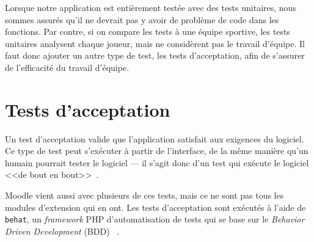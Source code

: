 Lorsque notre application est enti\`erement test\'ee avec des tests unitaires, nous sommes assur\'es qu'il ne devrait pas y avoir de probl\`eme de code dans les fonctions.
Par contre, si on compare les tests \`a une \'equipe sportive, les tests unitaires analysent chaque joueur, mais ne consid\`erent pas le travail d'\'equipe.
Il faut donc ajouter un autre type de test, les tests d'acceptation, afin de s'assurer de l'efficacit\'e du travail d'\'equipe.

\section{Tests d'acceptation}
\label{test_acceptation}
Un test d'acceptation valide que l'application satisfait aux exigences du logiciel.
Ce type de test peut s'ex\'ecuter \`a partir de l'interface, de la m\^eme mani\`ere qu'un humain pourrait tester le logiciel --- il s'agit donc d'un test qui ex\'ecute le logiciel <<de bout en bout>>~\cite{tremblay16}.

Moodle vient aussi avec plusieurs de ces tests, mais ce ne sont pas tous les modules d'extension qui en ont.
%
Les tests d'acceptation sont ex\'ecut\'es \`a l'aide de \texttt{behat}, un \textit{framework} PHP d'automatisation de tests qui se base sur le \og \textit{Behavior Driven Development} (BDD) \fg{}~\cite{tremblay16}.



